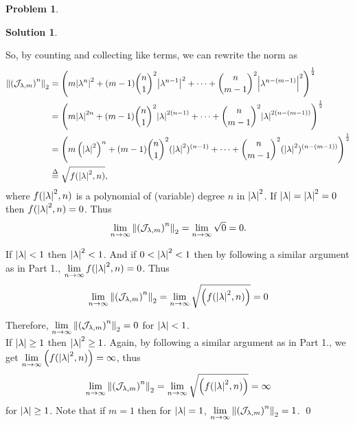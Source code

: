 \documentclass{article}
\theoremstyle{definition}
\newtheorem*{prob*}{Problem}
\newtheorem*{sln*}{Solution}
\newcommand{\jor}{\mathcal{J}}
\begin{document}
\begin{prob*}
\begin{sln*}
\begin{enumerate}
			So, by counting and collecting like terms, we can rewrite the norm as	
			\begin{align*}
			\norm{\left(\jor_{\lambda,m}\right)^n}_2 &= \left(m\abs{ \lambda^n}^2  + (m-1){n\choose 1}^2\abs{\lambda^{n-1}}^2 + \dots +  {n\choose m-1}^2\abs{  \lambda^{n-(m-1)}}^2   \right)^\frac{1}{2}\\
			&= \left( m\abs{\lambda}^{2n}  + (m-1){n\choose 1}^2\abs{\lambda}^{2(n-1)} + \dots + {n\choose m-1}^2\abs{  \lambda}^{2(n-(m-1))}  \right)^\frac{1}{2}\\
			&= \left( m\left(\abs{\lambda}^{2}\right)^n  + (m-1){n\choose 1}^2(\abs{\lambda}^{2})^{(n-1)} + \dots + {n\choose m-1}^2(\abs{  \lambda}^{2})^{(n-(m-1))}  \right)^\frac{1}{2}\\
			&\stackrel{\Delta}{=} \sqrt{f(\abs{\lambda}^2, n)},
			\end{align*}
			where $f(\abs{\lambda}^2, n)$ is a polynomial of (variable) degree $n$ in $\abs{\lambda}^2$. If $\abs{\lambda} = \abs{\lambda}^2 = 0$ then $ f(\abs{\lambda}^2, n) = 0 $. Thus  
			\begin{align*}
			\lim\limits_{n\to \infty}\norm{\left(\jor_{\lambda,m}\right)^n}_2 = \lim\limits_{n\to \infty}\sqrt{0} = 0.
			\end{align*}
			
			If $\abs{\lambda}< 1$ then $\abs{\lambda}^2< 1$. And if $0 <  \abs{\lambda}^2< 1$ then by following a similar argument as in Part 1., $\lim\limits_{n\to\infty} f(\abs{\lambda}^2, n) = 0$. Thus 
			\begin{align*}
			\lim\limits_{n\to \infty}\norm{\left(\jor_{\lambda,m}\right)^n}_2  = \lim\limits_{n\to\infty}\sqrt{\left(f(\abs{\lambda}^2, n)\right)}= 0
			\end{align*}
			
			Therefore, $\lim\limits_{n\to \infty}\norm{\left(\jor_{\lambda,m}\right)^n}_2 = 0$ for $\abs{\lambda} < 1$.\\
			
			If $\abs{\lambda} \geq 1$ then $\abs{\lambda}^2 \geq 1$. Again, by following a similar argument as in Part 1., we get   $\lim\limits_{n\to\infty} \left( f(\abs{\lambda}^2,n ) \right) = \infty$, thus
			\begin{align*}
			\lim\limits_{n\to \infty}\norm{\left(\jor_{\lambda,m}\right)^n}_2 = \lim\limits_{n\to\infty}\sqrt{\left(f(\abs{\lambda}^2,n)\right)} = \infty
			\end{align*}
			for $\abs{\lambda} \geq 1$. Note that if $m=1$ then for $\abs{  \lambda} = 1$, $\lim\limits_{n\to \infty}\norm{\left(\jor_{\lambda,m}\right)^n}_2 = 1$.  	  \qed
		\end{enumerate}
	\end{sln*}

\end{prob*}
\end{document}
